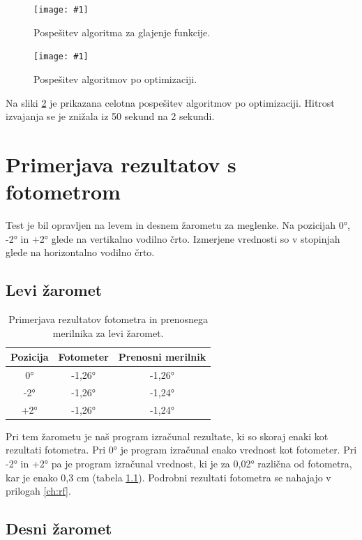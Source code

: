 \documentclass[oneside, a4paper, 12pt]{book}
\newcommand{\slika}[3]{
	\begin{figure}
	\begin{center}
	\texttt{[image: \#1]}
	\end{center}
	\vspace{-20pt}
	\caption{#2}
	\label{#3}
	\end{figure}
}
\begin{document}
\slika{slike/optimizacija_grafi/optimizacija-algoritma-za-glajenje-funkcij.jpg}
{Pospešitev algoritma za glajenje funkcije.}{pic:opt-g}

\slika{slike/optimizacija_grafi/celotna-pospesitev.jpg}
{Pospešitev algoritmov po optimizaciji.}{pic:opt-c}

Na sliki \ref{pic:opt-c} je prikazana celotna pospešitev algoritmov 
po optimizaciji. Hitrost izvajanja se je znižala iz 50 sekund na 2 sekundi.

\chapter{Primerjava rezultatov s fotometrom}
\label{ch:primerjava}
Test je bil opravljen na levem in desnem žarometu za meglenke. 
Na pozicijah 0°, -2° in +2° glede na vertikalno vodilno črto. 
Izmerjene vrednosti so v stopinjah glede na horizontalno vodilno črto.

\section{Levi žaromet}

\begin{table}
\begin{center}
\begin{tabular}{c|c|c}
\textbf{Pozicija} & \textbf{Fotometer} & \textbf{Prenosni merilnik} \\ \hline
0° & -1,26° & -1,26°  \\ \hline
-2°  & -1,26° & -1,24°   \\ \hline
+2°  & -1,26° & -1,24°   \\ 
\end{tabular}
\end{center}
\vspace{-20pt}
\caption{Primerjava rezultatov fotometra in prenosnega merilnika za 
levi žaromet.}

\label{tbl:primerjava-levi}
\end{table}

Pri tem žarometu je naš program izračunal rezultate, ki so skoraj 
enaki kot rezultati fotometra. Pri 0° je program izračunal enako 
vrednost kot fotometer. Pri -2° in +2° pa je program izračunal 
vrednost, ki je za 0,02° različna od fotometra, kar je enako 0,3 cm 
(tabela \ref{tbl:primerjava-levi}). Podrobni rezultati fotometra se
nahajajo v prilogah \ref{ch:rf}.

\section{Desni žaromet}
\end{document}
